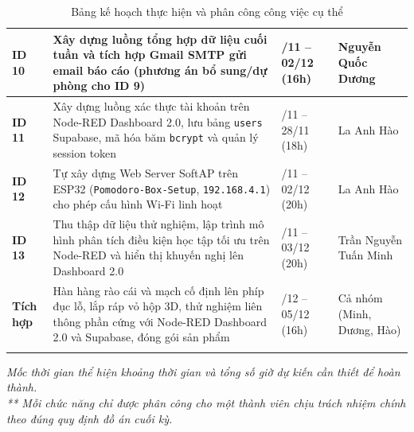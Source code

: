\begin{longtable}{|>{\centering\arraybackslash}p{1.4cm}|>{\raggedright\arraybackslash}p{7.8cm}|>{\raggedright\arraybackslash}p{3.4cm}|>{\raggedright\arraybackslash}p{3.8cm}|}
\textbf{ID 10} & Xây dựng luồng tổng hợp dữ liệu cuối tuần và tích hợp Gmail SMTP gửi email báo cáo (phương án bổ sung/dự phòng cho ID 9) & 29/11 -- 02/12 (16h) & Nguyễn Quốc Dương \\ \hline
\textbf{ID 11} & Xây dựng luồng xác thực tài khoản trên Node-RED Dashboard 2.0, lưu bảng \texttt{users} Supabase, mã hóa băm \texttt{bcrypt} và quản lý session token & 25/11 -- 28/11 (18h) & La Anh Hào \\ \hline
\textbf{ID 12} & Tự xây dựng Web Server SoftAP trên ESP32 (\texttt{Pomodoro-Box-Setup}, \texttt{192.168.4.1}) cho phép cấu hình Wi-Fi linh hoạt & 29/11 -- 02/12 (20h) & La Anh Hào \\ \hline
\textbf{ID 13} & Thu thập dữ liệu thử nghiệm, lập trình mô hình phân tích điều kiện học tập tối ưu trên Node-RED và hiển thị khuyến nghị lên Dashboard 2.0 & 29/11 -- 03/12 (20h) & Trần Nguyễn Tuấn Minh \\ \hline
\textbf{Tích hợp} & Hàn hàng rào cái và mạch cố định lên phíp đục lỗ, lắp ráp vỏ hộp 3D, thử nghiệm liên thông phần cứng với Node-RED Dashboard 2.0 và Supabase, đóng gói sản phẩm & 03/12 -- 05/12 (16h) & Cả nhóm (Minh, Dương, Hào) \\ \hline
\caption{Bảng kế hoạch thực hiện và phân công công việc cụ thể}
\label{tab:ke_hoach_thuc_hien}
\end{longtable}
\endgroup

\noindent \textit{\footnotesize * Mốc thời gian thể hiện khoảng thời gian và tổng số giờ dự kiến cần thiết để hoàn thành.\\
** Mỗi chức năng chỉ được phân công cho một thành viên chịu trách nhiệm chính theo đúng quy định đồ án cuối kỳ.}
